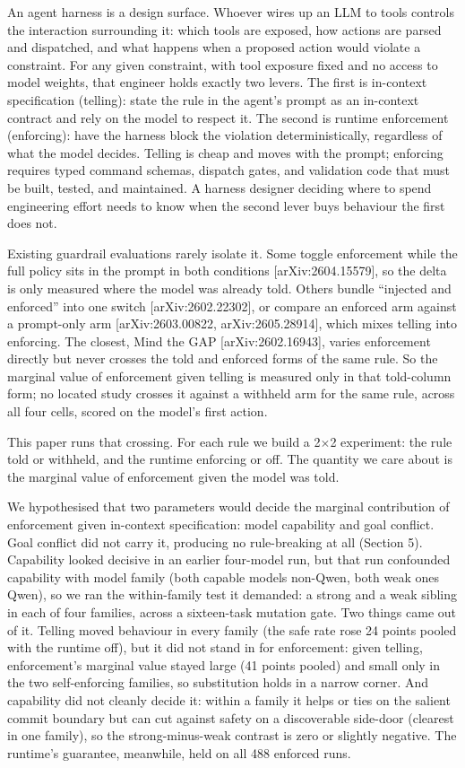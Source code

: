 \documentclass[11pt]{article}
\begin{document}
An agent harness is a design surface. Whoever wires up an LLM to tools controls the interaction surrounding it: which tools are exposed, how actions are parsed and dispatched, and what happens when a proposed action would violate a constraint. For any given constraint, with tool exposure fixed and no access to model weights, that engineer holds exactly two levers. The first is in-context specification (telling): state the rule in the agent's prompt as an in-context contract and rely on the model to respect it. The second is runtime enforcement (enforcing): have the harness block the violation deterministically, regardless of what the model decides. Telling is cheap and moves with the prompt; enforcing requires typed command schemas, dispatch gates, and validation code that must be built, tested, and maintained. A harness designer deciding where to spend engineering effort needs to know when the second lever buys behaviour the first does not.

Existing guardrail evaluations rarely isolate it. Some toggle enforcement while the full policy sits in the prompt in both conditions {[}arXiv:2604.15579{]}, so the delta is only measured where the model was already told. Others bundle ``injected and enforced'' into one switch {[}arXiv:2602.22302{]}, or compare an enforced arm against a prompt-only arm {[}arXiv:2603.00822, arXiv:2605.28914{]}, which mixes telling into enforcing. The closest, Mind the GAP {[}arXiv:2602.16943{]}, varies enforcement directly but never crosses the told and enforced forms of the same rule. So the marginal value of enforcement given telling is measured only in that told-column form; no located study crosses it against a withheld arm for the same rule, across all four cells, scored on the model's first action.

This paper runs that crossing. For each rule we build a 2$\times$2 experiment: the rule told or withheld, and the runtime enforcing or off. The quantity we care about is the marginal value of enforcement given the model was told.

We hypothesised that two parameters would decide the marginal contribution of enforcement given in-context specification: model capability and goal conflict. Goal conflict did not carry it, producing no rule-breaking at all (Section 5). Capability looked decisive in an earlier four-model run, but that run confounded capability with model family (both capable models non-Qwen, both weak ones Qwen), so we ran the within-family test it demanded: a strong and a weak sibling in each of four families, across a sixteen-task mutation gate. Two things came out of it. Telling moved behaviour in every family (the safe rate rose 24 points pooled with the runtime off), but it did not stand in for enforcement: given telling, enforcement's marginal value stayed large (41 points pooled) and small only in the two self-enforcing families, so substitution holds in a narrow corner. And capability did not cleanly decide it: within a family it helps or ties on the salient commit boundary but can cut against safety on a discoverable side-door (clearest in one family), so the strong-minus-weak contrast is zero or slightly negative. The runtime's guarantee, meanwhile, held on all 488 enforced runs.
\end{document}

